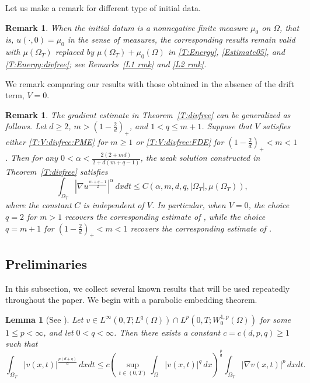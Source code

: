 \documentclass{amsart}
\newtheorem{lemma}[defn]{Lemma}
\newtheorem{remark}[defn]{Remark}
\numberwithin{equation}{section}
\begin{document}

Let us make a remark for different type of initial data.
\begin{remark}\label{L0 rmk}
When the initial datum is a nonnegative finite measure $\mu_0$ on $\Omega$, that is, $u(\cdot,0)=\mu_0$ in the sense of measures, the corresponding results remain valid with $\mu(\Omega_T)$ replaced by $\mu(\Omega_T)+\mu_0(\Omega)$ in \eqref{T:Energy}, \eqref{Estimate05}, and \eqref{T:Energy:divfree}; see Remarks~\ref{L1 rmk} and \ref{L2 rmk}.
\end{remark}

We remark comparing our results with those obtained in the absence of the drift term, $V=0$.
\begin{remark}\label{R:divfree-q-est}
The gradient estimate in Theorem~\ref{T:divfree} can be generalized as follows. Let $d\geq 2$, $m>\left(1-\frac{2}{d}\right)_+$, and $1<q\le m+1$. Suppose that $V$ satisfies either \eqref{T:V:divfree:PME} for $m\geq 1$ or \eqref{T:V:divfree:FDE} for $\left(1-\frac{2}{d}\right)_+<m<1$. Then for any $0<\alpha<
\frac{2(2+md)}{2+d(m+q-1)}$, the weak solution constructed in Theorem~\ref{T:divfree} satisfies
\begin{equation*}\label{Estimate05:divfree}
\int_{\Omega_T}
\left|\nabla u^{\frac{m+q-1}{2}}\right|^\alpha\,dxdt
\le
C\left(\alpha,m,d,q,|\Omega_T|,\mu(\Omega_T)\right),
\end{equation*}
where the constant $C$ is independent of $V$.
In particular, when $V=0$, the choice $q=2$
for $m>1$ recovers the corresponding estimate of \cite{BDG13}, while the choice $q=m+1$ for $\left(1-\frac{2}{d}\right)_+<m<1$ recovers the corresponding estimate of \cite{BDG15}.
\end{remark}






\subsection{Preliminaries}\label{S:Preliminaries}


In this subsection, we collect several known results that will be used repeatedly throughout the paper.
We begin with a parabolic embedding theorem.

\begin{lemma}[See {\cite[Propositions~I.3.1 \& I.3.2]{DB93}}]\label{T:pSobolev}
Let $v \in L^{\infty}(0,T;L^{q}(\Omega)) \cap L^{p}(0,T;W_0^{1,p}(\Omega))$ for some $1 \leq p < \infty$, and let $0 < q < \infty$.
Then there exists a constant $c=c(d,p,q)\ge1$ such that
\[
\int_{\Omega_T} |v(x,t)|^{\frac{p(d+q)}{d}}\,dxdt
\leq
c \left(\sup_{t\in(0,T)}\int_{\Omega} |v(x,t)|^{q}\,dx \right)^{\frac{p}{d}}
\int_{\Omega_T} |\nabla v(x,t)|^{p}\,dxdt.
\]
\end{lemma}
\end{document}
